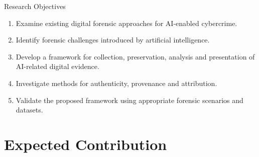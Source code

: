 \documentclass[aspectratio=169,11pt]{beamer}
\begin{document}
	\begin{frame}{Research Objectives}
		
		\begin{enumerate}
			
			\item Examine existing digital forensic approaches for
			AI-enabled cybercrime.
			
			\vspace{0.25cm}
			
			\item Identify forensic challenges introduced by
			artificial intelligence.
			
			\vspace{0.25cm}
			
			\item Develop a framework for collection, preservation,
			analysis and presentation of AI-related digital evidence.
			
			\vspace{0.25cm}
			
			\item Investigate methods for authenticity, provenance
			and attribution.
			
			\vspace{0.25cm}
			
			\item Validate the proposed framework using appropriate
			forensic scenarios and datasets.
			
		\end{enumerate}
		
	\end{frame}
	
	
	\section{Expected Contribution}
	
	
\end{document}
